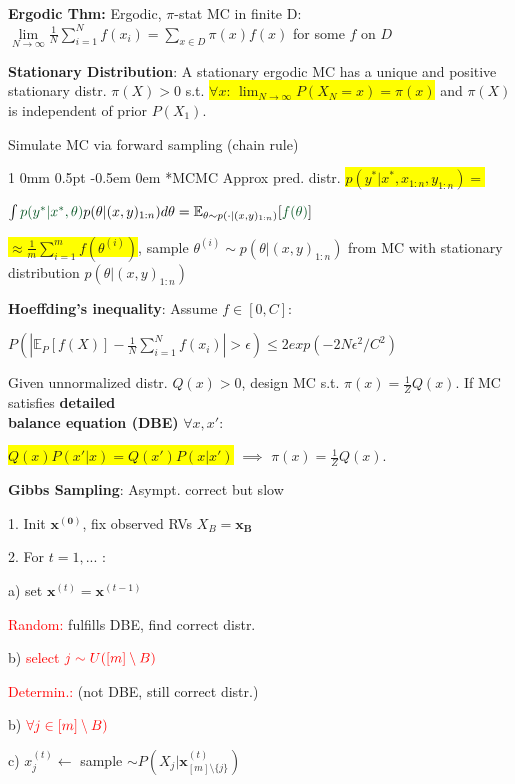 \documentclass[11pt,landscape,a4paper,fleqn]{article}
\makeatletter
\newcommand*{\rsection}{%
	\@startsection{section}%
	{1}%
	{0mm}%
	{0.5pt}%
	{-0.5em \@plus 0em}
	{\color{myorange}\sffamily\small\bfseries}}
\newcommand{\mhl}[1]{\setlength{\fboxsep}{0pt}\colorbox{yellow}{#1}}
\makeatother
\begin{document}
\begin{multicols*}{4}
\textbf{Ergodic Thm:}
Ergodic, $\pi$-stat MC in finite D: $\lim\limits_{N\rightarrow\infty}\frac{1}{N}\sum\limits^N_{i=1}f(x_i)=\sum\limits_{x\in D}\pi(x) f(x)$ for some $f$ on $D$ 

\textbf{Stationary Distribution}: A stationary ergodic MC has a unique and positive stationary distr. $\pi(X) > 0$ s.t. \mhl{$\forall x$: $\lim_{N \rightarrow \infty} P(X_N = x) = \pi(x)$} and $\pi(X)$ is independent of prior $P(X_1)$.

Simulate MC via forward sampling (chain rule)

\rsection*{MCMC} Approx pred. distr. \mhl{$p(y^* | x^*, x_{1:n}, y_{1:n}) =$}

$\int \textcolor{darkgreen}{p(y^* | x^*, \theta)} p(\theta | (x,y)_{1:n})d\theta = \mathbb{E}_{\theta \sim p(\cdot | (x,y)_{1:n})}[\textcolor{darkgreen}{f(\theta)}]$

\mhl{$\approx \frac{1}{m} \sum_{i=1}^{m} f(\theta^{(i)})$}, sample $\theta^{(i)} \sim p(\theta | (x,y)_{1:n})$ from MC with stationary distribution $p(\theta| (x,y)_{1:n})$

\textbf{Hoeffding's inequality}: Assume $f \in [0,C]$:

\mbox{\fontsize{9.5}{6}\selectfont $P(|\mathbb{E}_P[f(X)] - \frac{1}{N}\sum_{i=1}^{N} f(x_i)| > \epsilon) \leq 2 exp(-2N\epsilon^2/C^2)$}



Given unnormalized distr. $Q(x) > 0$, design MC s.t. $\pi(x) = \frac{1}{Z} Q(x)$. If MC satisfies \textbf{detailed\\ balance equation (DBE)} $\forall x,x'$:

\mhl{$Q(x)P(x' | x) = Q(x')P(x | x')$} $\implies$ $\pi(x) = \frac{1}{Z} Q(x)$.

\textbf{Gibbs Sampling}: Asympt. correct but slow

1. Init $\mathbf{x^{(0)}}$, fix observed RVs $X_B=\mathbf{x_B}$

2. For $t=1,...$ :

a) set $\mathbf{x}^{(t)} = \mathbf{x}^{(t-1)}$

\textcolor{red}{Random:} fulfills DBE, find correct distr.


b) \textcolor{red}{select} $\textcolor{red}{j \sim U( [m] \setminus B)}$

\textcolor{red}{Determin.:} (not DBE, still correct distr.)

b) $\textcolor{red}{\forall j \in [m] \setminus B)}$

c) $x_j^{(t)}\leftarrow$ sample $ \sim P(X_j | \mathbf{x}^{(t)}_{[m] \setminus \{j\}})$


\end{multicols*}
\end{document}
